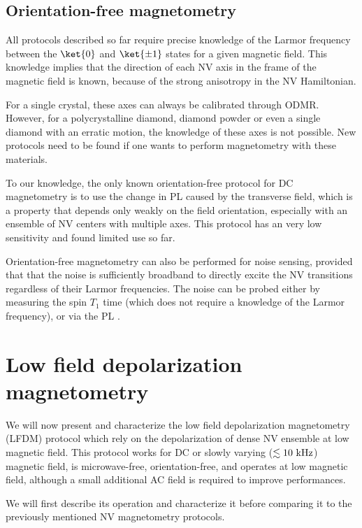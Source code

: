\documentclass[a4paper, 11pt]{book}
\begin{document}
\subsection{Orientation-free magnetometry}
All protocols described so far require precise knowledge of the Larmor frequency between the $\ket{0}$ and $\ket{\pm 1}$ states for a given magnetic field. This knowledge implies that the direction of each NV axis in the frame of the magnetic field is known, because of the strong anisotropy in the NV Hamiltonian. 

For a single crystal, these axes can always be calibrated through ODMR. However, for a polycrystalline diamond, diamond powder or even a single diamond with an erratic motion, the knowledge of these axes is not possible. New protocols need to be found if one wants to perform magnetometry with these materials.

To our knowledge, the only known orientation-free protocol for DC magnetometry is to use the change in PL caused by the transverse field, which is a property that depends only weakly on the field orientation, especially with an ensemble of NV centers with multiple axes. This protocol has an very low sensitivity and found limited use so far\citep{rondin2012nanoscale, tetienne2012magnetic, maletinsky2012robust, chapman2013background, jones2020selective}.

Orientation-free magnetometry can also be performed for noise sensing, provided that that the noise is sufficiently broadband to directly excite the NV transitions regardless of their Larmor frequencies. The noise can be probed either by measuring the spin $T_1$ time \citep{kolkowitz2015probing, andersen2019electron} (which does not require a knowledge of the Larmor frequency), or via the PL \citep{finco2021imaging}.

\section{Low field depolarization magnetometry}
\label{sec LFDM}
We will now present and characterize the low field depolarization magnetometry (LFDM) protocol which rely on the depolarization of dense NV ensemble at low magnetic field. This protocol works for DC or slowly varying ($\lesssim 10\ \rm kHz$) magnetic field, is microwave-free, orientation-free, and operates at low magnetic field, although a small additional AC field is required to improve performances.

We will first describe its operation and characterize it before comparing it to the previously mentioned NV magnetometry protocols.
\end{document}
